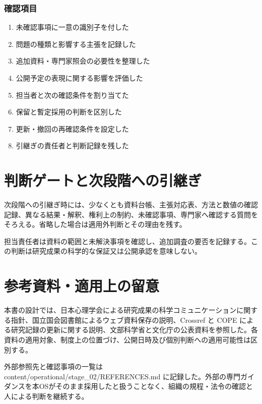 \documentclass[a4paper,11pt]{article}
\begin{document}
\subsubsection*{確認項目}
\begin{enumerate}[leftmargin=2em,itemsep=0.3em]
\item 未確認事項に一意の識別子を付した\par
\item 問題の種類と影響する主張を記録した\par
\item 追加資料・専門家照会の必要性を整理した\par
\item 公開予定の表現に関する影響を評価した\par
\item 担当者と次の確認条件を割り当てた\par
\item 保留と暫定採用の判断を区別した\par
\item 更新・撤回の再確認条件を設定した\par
\item 引継ぎの責任者と判断記録を残した\par
\end{enumerate}
\section{判断ゲートと次段階への引継ぎ}
\par 次段階への引継ぎ時には、少なくとも資料台帳、主張対応表、方法と数値の確認記録、異なる結果・解釈、権利上の制約、未確認事項、専門家へ確認する質問をそろえる。省略した場合は適用外判断とその理由を残す。\par\medskip
\par 担当責任者は資料の範囲と未解決事項を確認し、追加調査の要否を記録する。この判断は研究成果の科学的な保証又は公開承認を意味しない。\par\medskip
\section{参考資料・適用上の留意}
\par 本書の設計では、日本心理学会による研究成果の科学コミュニケーションに関する指針、国立国会図書館によるウェブ資料保存の説明、Crossref と COPE による研究記録の更新に関する説明、文部科学省と文化庁の公表資料を参照した。各資料の適用対象、制度上の位置づけ、公開日時及び個別判断への適用可能性は区別する。\par\medskip
\par 外部参照先と確認事項の一覧は content/operational/stage\_02/REFERENCES.md に記録した。外部の専門ガイダンスを本OSがそのまま採用したと扱うことなく、組織の規程・法令の確認と人による判断を継続する。\par\medskip
\end{document}
